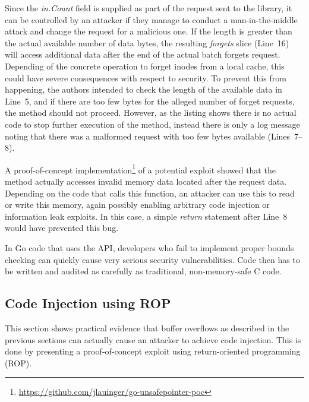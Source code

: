 Since the \textit{in.Count} field is supplied as part of the request sent to the library, it can be controlled by an
attacker if they manage to conduct a man-in-the-middle attack and change the request for a malicious
one.
If the length is greater than the actual available number of data bytes, the resulting \textit{forgets} slice
(Line~16) will access additional data after the end of the actual batch forgets request.
Depending of the concrete operation to forget inodes from a local cache, this could have severe consequences with
respect to security.
To prevent this from happening, the authors intended to check the length of the available data in Line~5, and if there
are too few bytes for the alleged number of forget requests, the method should not proceed.
However, as the listing shows there is no actual code to stop further execution of the method, instead there is only a
log message noting that there was a malformed request with too few bytes available (Lines~7--8).

A proof-of-concept implementation\footnote{\url{https://github.com/jlauinger/go-unsafepointer-poc}} of a potential
exploit showed that the method actually accesses invalid memory data located after the request data.
Depending on the code that calls this function, an attacker can use this to read or write this memory, again possibly
enabling arbitrary code injection or information leak exploits.
In this case, a simple \textit{return} statement after Line~8 would have prevented this bug.

\begin{insight}
    In Go code that uses the \unsafe{} \acrshort{API}, developers who fail to implement proper bounds checking can
    quickly cause very serious security vulnerabilities.
    Code then has to be written and audited as carefully as traditional, non-memory-safe C code.
\end{insight}



\subsection{Code Injection using ROP}\label{subsec:unsafe-security-problems:buffer-overflow:code-flow-redirection}

This section shows practical evidence that buffer overflows as described in the previous sections can actually cause an
attacker to achieve code injection.
This is done by presenting a proof-of-concept exploit using return-oriented programming (\acrshort{ROP}).

